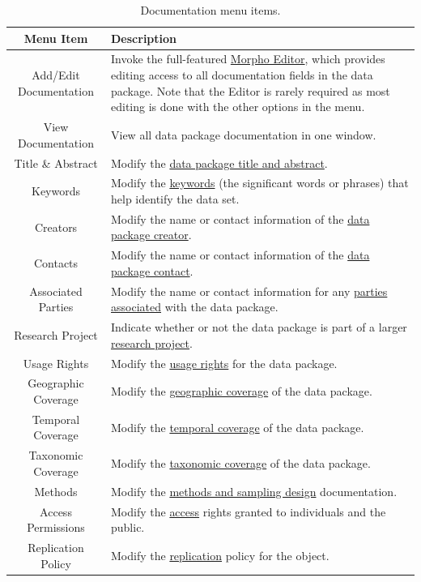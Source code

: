 \begin{table}[htbp]
  \centering
  \begin{tabular}{|c|m{}|}
  \hline
  \textbf{Menu Item} & \textbf{Description} \\
  \hline
  Add/Edit Documentation &
    Invoke the full-featured \hyperref[sec:edit-doc-tree]{Morpho
    Editor}, which provides editing access to all documentation fields
    in the data package. Note that the Editor is rarely required as most
    editing is done with the other options in the menu. \\
  \hline
  View Documentation &
    View all data package documentation in one window. \\
  \hline
  Title \& Abstract &
    Modify the \hyperref[sec:wizard-dp-title]{data package title and
    abstract}. \\
  \hline
  Keywords &
    Modify the \hyperref[sec:wizard-dp-keywords]{keywords} (the significant
    words or phrases) that help identify the data set. \\
  \hline
  Creators &
    Modify the name or contact information of the
    \hyperref[sec:wizard-dp-people]{data package creator}. \\
  \hline
  Contacts &
    Modify the name or contact information of the
    \hyperref[sec:wizard-dp-people]{data package contact}. \\
  \hline
  Associated Parties &
    Modify the name or contact information for any
    \hyperref[sec:wizard-dp-people]{parties associated} with the data
    package. \\
  \hline
  Research Project &
    Indicate whether or not the data package is part of a larger
    \hyperref[sec:wizard-dp-project]{research project}. \\
  \hline
  Usage Rights &
    Modify the \hyperref[sec:wizard-dp-usage]{usage rights} for the data
    package. \\
  \hline
  Geographic Coverage &
    Modify the \hyperref[sec:wizard-dp-coverage]{geographic coverage} of
    the data package. \\
  \hline
  Temporal Coverage &
    Modify the \hyperref[sec:wizard-dp-coverage]{temporal coverage} of
    the data package. \\
  \hline
  Taxonomic Coverage &
    Modify the \hyperref[sec:wizard-dp-coverage]{taxonomic coverage} of
    the data package. \\
  \hline
  Methods &
    Modify the \hyperref[sec:wizard-dp-methods]{methods and sampling
    design} documentation. \\
  \hline
  Access Permissions &
    Modify the \hyperref[sec:wizard-dp-access]{access} rights granted
    to individuals and the public. \\
  \hline
  Replication Policy &
    Modify the \hyperref[sec:wizard-dp-replication]{replication} policy
    for the object. \\  
  \hline
  \end{tabular}
  \caption{Documentation menu items.}
  \label{tab:edit-doc-items}
\end{table}

